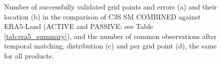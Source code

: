 \begin{figure}[htbp!]
\centering
\begin{minipage}[c]{0.34\textwidth}
    \centering
    \subcaption{} %
\end{minipage}%
\hfill
\begin{minipage}[c]{0.64\textwidth}
    \centering
    \subcaption{} %
\end{minipage}
\medskip
\begin{minipage}[c]{0.34\textwidth}
    \centering
    \subcaption{} %
\end{minipage}%
\hfill
\begin{minipage}[c]{0.64\textwidth}
    \centering
    \subcaption{} %
\end{minipage}
\caption{Number of successfully validated grid points and errors (a) and their location (b) in the comparison of \ac{C3S} SM COMBINED against ERA5-Land (ACTIVE and PASSIVE: see Table \ref{tab:era5_summary}), and the number of common observations after temporal matching, distribution (c) and per grid point (d), the same for all products.}
\label{fig:era5_status\runidx}
\end{figure}

